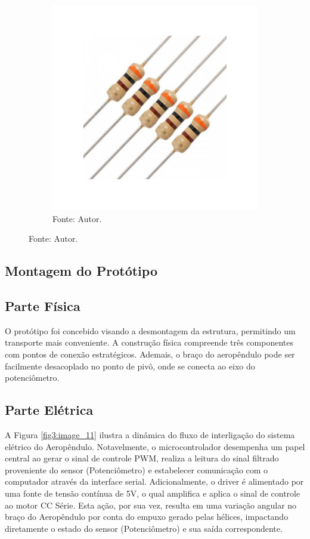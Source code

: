 \begin{figure}[!h]
\begin{subfigure}[b]{0.48\textwidth}
         \includegraphics[width=\textwidth, page=2]{Capitulos/3_simulacao_e_prototipo/3_figuras/res_cap.pdf}
         \caption*{Fonte: Autor.}
         \label{fig3:image_10}
     \end{subfigure}
\end{figure}


\subsection{Montagem do Protótipo}

\subsection{Parte Física}

O protótipo foi concebido visando a desmontagem da estrutura, permitindo um transporte mais conveniente. A construção física compreende três componentes com pontos de conexão estratégicos. Ademais, o braço do aeropêndulo pode ser facilmente desacoplado no ponto de pivô, onde se conecta ao eixo do potenciômetro.

\subsection{Parte Elétrica}


A Figura \ref{fig3:image_11} ilustra a dinâmica do fluxo de interligação do sistema elétrico do Aeropêndulo. Notavelmente, o microcontrolador desempenha um papel central ao gerar o sinal de controle PWM, realiza a leitura do sinal filtrado proveniente do sensor (Potenciômetro) e estabelecer comunicação com o computador através da interface serial. Adicionalmente, o driver é alimentado por uma fonte de tensão contínua de 5V, o qual amplifica e aplica o sinal de controle ao motor CC Série. Esta ação, por sua vez, resulta em uma variação angular no braço do Aeropêndulo por conta do empuxo gerado pelas hélices, impactando diretamente o estado do sensor (Potenciômetro) e sua saída correspondente.

